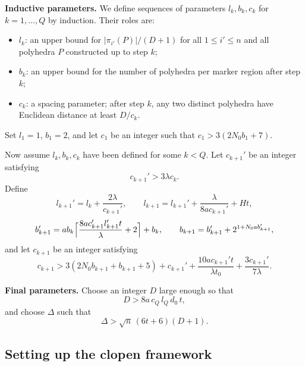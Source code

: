 \documentclass{amsart}
\theoremstyle{definition}
\begin{document}
\medskip\noindent
\textbf{Inductive parameters.}
We define sequences of parameters $l_k, b_k, c_k$ for $k=1,\dots, Q$ by
induction. Their roles are:
\begin{itemize}
\item $l_k$: an upper bound for $|\pi_{i'}(P)|/(D+1)$ for all
$1\leq i'\leq n$ and all polyhedra $P$ constructed up to step $k$;
\item $b_k$: an upper bound for the number of polyhedra per marker
region after step $k$;
\item $c_k$: a spacing parameter; after step $k$, any two distinct
polyhedra have Euclidean distance at least $D/c_k$.
\end{itemize}

Set $l_1=1$, $b_1=2$, and let $c_1$ be an integer such that
$c_1>3(2N_0b_1+7)$.

Now assume $l_k, b_k, c_k$ have been defined for some $k<Q$. Let
$c_{k+1}'$ be an integer satisfying
\begin{equation}\label{eq:cprime}
c_{k+1}'>3\lambda c_k.
\end{equation}
Define
\begin{equation}\label{eq:l}
l_{k+1}' = l_k + \frac{2\lambda}{c_{k+1}'},\qquad
l_{k+1} = l_{k+1}' + \frac{\lambda}{8a c_{k+1}'} + H t,
\end{equation}
\begin{equation}\label{eq:b}
b_{k+1}' = a b_k
\Bigl\lceil \frac{8a c_{k+1}' l_{k+1}' t}{\lambda}+2 \Bigr\rceil
+ b_k,\qquad
b_{k+1} = b_{k+1}' + 2^{1+N_0 a b_{k+1}'},
\end{equation}
and let $c_{k+1}$ be an integer satisfying
\begin{equation}\label{eq:c}
c_{k+1} > 3(2N_0b_{k+1}+b_{k+1}+5) + c_{k+1}'
+ \frac{10a c_{k+1}' t}{\lambda t_0}
+ \frac{3c_{k+1}'}{7\lambda}.
\end{equation}

\medskip\noindent
\textbf{Final parameters.}
Choose an integer $D$ large enough so that
\begin{equation}\label{eq:D}
D > 8a\, c_Q\, l_Q\, d_0\, t,
\end{equation}
and choose $\Delta$ such that
\begin{equation}\label{eq:Delta}
\Delta > \sqrt{n}\,(6t+6)(D+1).
\end{equation}

\subsection{Setting up the clopen framework}
\end{document}
